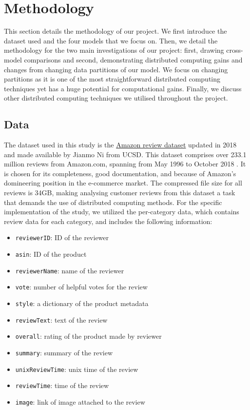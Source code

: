 \documentclass[sigconf,authorversion,nonacm]{acmart}
\begin{document}
\section{Methodology}

This section details the methodology of our project. We first introduce the dataset used and the four models that we focus on. Then, we detail the methodology for the two main investigations of our project: first, drawing cross-model comparisons and second, demonstrating distributed computing gains and changes from changing data partitions of our model. We focus on changing partitions as it is one of the most straightforward distributed computing techniques yet has a huge potential for computational gains. Finally, we discuss other distributed computing techniques we utilised throughout the project.

\subsection{Data}
    The dataset used in this study is the \href{https://cseweb.ucsd.edu/~jmcauley/datasets/amazon_v2/}{Amazon review dataset} updated in 2018 and made available by Jianmo Ni from UCSD. This dataset comprises over 233.1 million reviews from Amazon.com, spanning from May 1996 to October 2018 \cite{ni_li_mcauley_2019}. It is chosen for its completeness, good documentation, and because of Amazon's domineering position in the e-commerce market. The compressed file size for all reviews is 34GB, making analysing customer reviews from this dataset a task that demands the use of distributed computing methods. For the specific implementation of the study, we utilized the per-category data, which contains review data for each category, and includes the following information:
    
    \begin{itemize}
    \item \verb|reviewerID|: ID of the reviewer
    \item \verb|asin|: ID of the product
    \item \verb|reviewerName|: name of the reviewer
    \item \verb|vote|: number of helpful votes for the review
    \item \verb|style|: a dictionary of the product metadata
    \item \verb|reviewText|: text of the review
    \item \verb|overall|: rating of the product made by reviewer
    \item \verb|summary|: summary of the review
    \item \verb|unixReviewTime|: unix time of the review
    \item \verb|reviewTime|: time of the review
    \item \verb|image|: link of image attached to the review
    \end{itemize}
    
\end{document}
